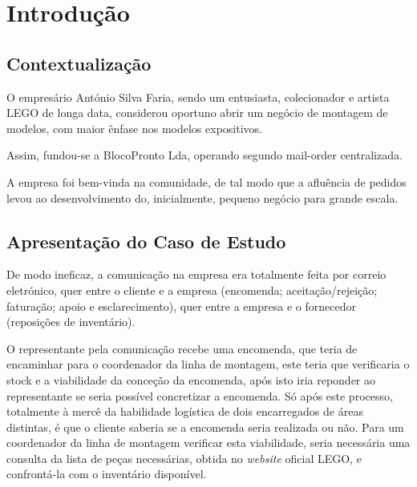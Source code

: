 

\chapter{Introdução}
    
    \section{Contextualização}
        
        O empresário António Silva Faria, sendo um entusiasta, colecionador e artista LEGO de longa data, considerou oportuno abrir um negócio de montagem de modelos, com maior ênfase nos modelos expositivos. 
        
        Assim, fundou-se a BlocoPronto Lda, operando segundo mail-order centralizada.
        
        A empresa foi bem-vinda na comunidade, de tal modo que a afluência de pedidos levou ao desenvolvimento do, inicialmente, pequeno negócio para grande escala.

    \section{Apresentação do Caso de Estudo}
        
        De modo ineficaz, a comunicação na empresa era totalmente feita por correio eletrónico, quer entre o cliente e a empresa (encomenda; aceitação/rejeição; faturação; apoio e esclarecimento), quer entre a empresa e o fornecedor (reposições de inventário).


        O representante pela comunicação recebe uma encomenda, que teria de encaminhar para o coordenador da linha de montagem, este teria que verificaria o stock e a viabilidade da conceção da encomenda, após isto iria reponder ao representante se seria possível concretizar a encomenda. Só após este processo, totalmente à mercê da habilidade logística de dois encarregados de áreas distintas, é que o cliente saberia se a encomenda seria realizada ou não. Para um coordenador da linha de montagem verificar esta viabilidade, seria necessária uma consulta da lista de peças necessárias, obtida no \textit{website} oficial LEGO, e confrontá-la com o inventário disponível.
        
